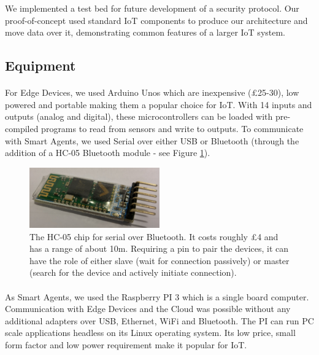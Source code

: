 
We implemented a test bed for future development of a security protocol. Our proof-of-concept used standard IoT components to produce our architecture and move data over it, demonstrating common features of a larger IoT system.



\subsection{Equipment}
\paragraph{}
For Edge Devices, we used Arduino Unos which are inexpensive (£25-30), low powered and portable making them a popular choice for IoT. With 14 inputs and outputs (analog and digital), these microcontrollers can be loaded with pre-compiled programs to read from sensors and write to outputs. To communicate with Smart Agents, we used Serial over either USB or Bluetooth (through the addition of a HC-05 Bluetooth module - see Figure \ref{fig:HC-05}).


\begin{figure}
    \centering
    \includegraphics[width=0.5\textwidth]{HC05.jpg}
    \caption{The HC-05 chip for serial over Bluetooth. It costs roughly £4 and has a range of about 10m. Requiring a pin to pair the devices, it can have the role of either slave (wait for connection passively) or master (search for the device and actively initiate connection).}
    \label{fig:HC-05}
\end{figure}

\paragraph{}
As Smart Agents, we used the Raspberry PI 3 which is a single board computer. Communication with Edge Devices and the Cloud was possible without any additional adapters over USB, Ethernet, WiFi and Bluetooth. The PI can run PC scale applications headless on its Linux operating system. Its low price, small form factor and low power requirement make it popular for IoT.

